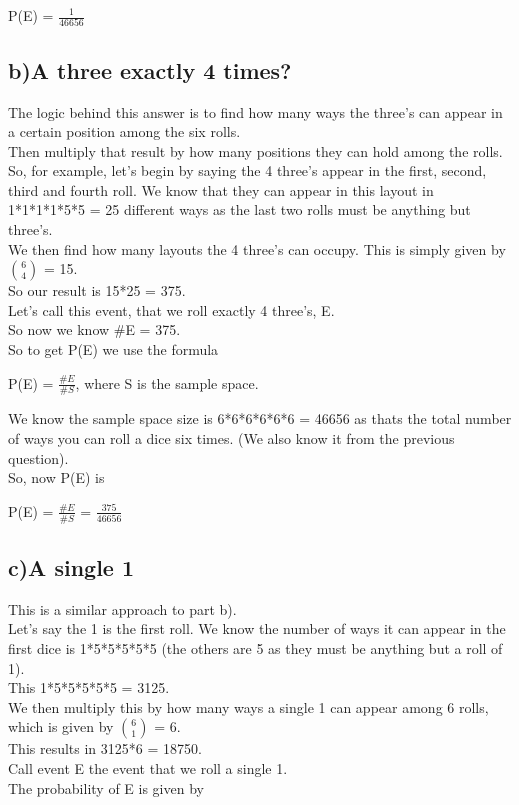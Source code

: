 \documentclass{report}
\begin{document}
		\begin{center}
			P(E) = $\frac{1}{46656}$
		\end{center}


	
		\subsection*{b)A three exactly 4 times?}

		The logic behind this answer is to find how many ways the three's can appear in a certain position among the six rolls.\\
		Then multiply that result by how many positions they can hold among the rolls.\\
		So, for example, let's begin by saying the 4 three's appear in the first, second, third and fourth roll. We know that they can appear in this layout
		in 1*1*1*1*5*5 = 25 different ways as the last two rolls must be anything but three's.\\
		We then find how many layouts the 4 three's can occupy. This is simply given by ${6 \choose 4}$ = 15.\\
		So our result is 15*25 = 375.\\
		Let's call this event, that we roll exactly 4 three's, E.\\
		So now we know \#E = 375.\\
		So to get P(E) we use the formula

		\begin{center}
			P(E) = $\frac{\#E}{\#S}$, where S is the sample space.
		\end{center}

		We know the sample space size is 6*6*6*6*6*6 = 46656 as thats the total number of ways you can roll a dice six times. (We also know it from the previous question).\\
		So, now P(E) is

		\begin{center}
			P(E) = $\frac{\#E}{\#S}$ = $\frac{375}{46656}$
		\end{center}




			
		\subsection*{c)A single 1}
		
			This is a similar approach to part b).\\
			Let's say the 1 is the first roll. We know the number of ways it can appear in the first dice is 1*5*5*5*5*5 (the others are 5 as they must be anything but a roll of 1).\\
			This 1*5*5*5*5*5 = 3125.\\
			We then multiply this by how many ways a single 1 can appear among 6 rolls, which is given by ${6 \choose 1}$ = 6.\\
			This results in 3125*6 = 18750.\\
			Call event E the event that we roll a single 1.\\
			The probability of E is given by 
\end{document}
